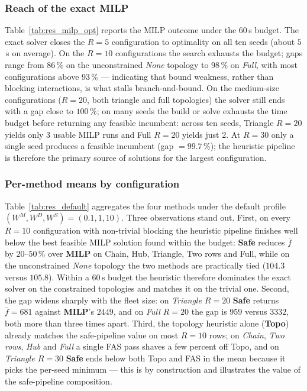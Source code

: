 \subsubsection{Reach of the exact MILP}

Table~\ref{tab:res_milp_opt} reports the MILP outcome under the 60\,s
budget.  The exact solver closes the $R{=}5$ configuration to
optimality on all ten seeds (about $5$\,s on average).  On the $R{=}10$
configurations the search exhausts the budget; gaps range from
$86\,\%$ on the unconstrained \emph{None} topology to $98\,\%$ on
\emph{Full}, with most configurations above $93\,\%$ --- indicating
that bound weakness, rather than blocking interactions, is what stalls
branch-and-bound.  On the medium-size configurations ($R{=}20$, both
triangle and full topologies) the solver still ends with a gap close to
$100\,\%$; on many seeds the build or solve exhausts the time budget
before returning any feasible incumbent: across ten seeds, Triangle
$R{=}20$ yields only 3 usable MILP runs and Full $R{=}20$ yields just
2.  At $R{=}30$ only a single seed produces a feasible incumbent
(gap $= 99.7\,\%$); the heuristic pipeline is therefore the primary
source of solutions for the largest configuration.



\subsubsection{Per-method means by configuration}

Table~\ref{tab:res_default} aggregates the four methods under the
default profile $(W^M, W^D, W^S) = (0.1, 1, 10)$.  Three observations
stand out.  First, on every $R{=}10$ configuration with non-trivial
blocking the heuristic pipeline finishes well below the best feasible
MILP solution found within the budget: \textbf{Safe} reduces $\bar f$ by
$20$--$50\,\%$ over \textbf{MILP} on Chain, Hub, Triangle, Two rows and
Full, while on the unconstrained \emph{None} topology the two methods
are practically tied ($104.3$ versus $105.8$).  Within a 60\,s budget
the heuristic therefore dominates the exact solver on the constrained
topologies and matches it on the trivial one.  Second, the gap widens
sharply with the fleet size: on \emph{Triangle $R{=}20$} \textbf{Safe}
returns $\bar f = 681$ against \textbf{MILP}'s $2449$, and on
\emph{Full $R{=}20$} the gap is $959$ versus $3332$, both more than
three times apart.  Third, the topology heuristic alone (\textbf{Topo})
already matches the safe-pipeline value on most $R{=}10$ rows; on
\emph{Chain}, \emph{Two rows}, \emph{Hub} and \emph{Full} a single FAS
pass shaves a few percent off Topo, and on \emph{Triangle $R{=}30$}
\textbf{Safe} ends below both Topo and FAS in the mean because it
picks the per-seed minimum --- this is by construction and illustrates
the value of the safe-pipeline composition.

